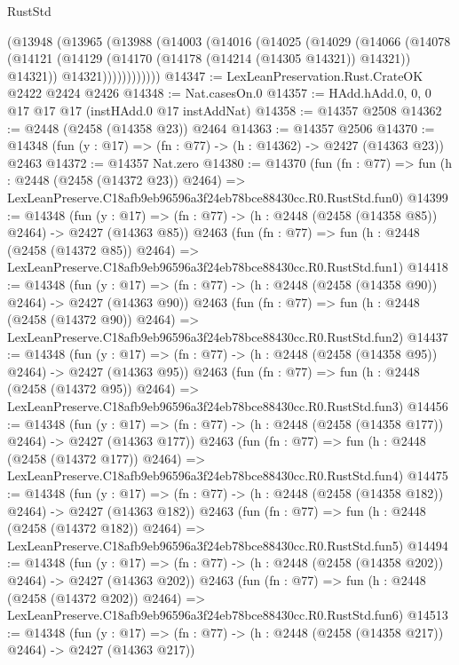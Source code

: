 \begin{lexlean}{RustStd}
\begin{coremodule}
          (@13948
            (@13965
              (@13988
                (@14003
                  (@14016
                    (@14025
                      (@14029
                        (@14066
                          (@14078
                            (@14121
                              (@14129 (@14170 (@14178 (@14214 (@14305 @14321)) @14321)) @14321))
                            @14321))))))))))))
@14347 := LexLeanPreservation.Rust.CrateOK @2422 @2424 @2426
@14348 := Nat.casesOn.{0}
@14357 := HAdd.hAdd.{0, 0, 0} @17 @17 @17 (instHAdd.{0} @17 instAddNat)
@14358 := @14357 @2508
@14362 := @2448 (@2458 (@14358 @23)) @2464
@14363 := @14357 @2506
@14370 := @14348 (fun (y : @17) => (fn : @77) -> (h : @14362) -> @2427 (@14363 @23)) @2463
@14372 := @14357 Nat.zero
@14380 := @14370
    (fun (fn : @77) =>
    fun (h : @2448 (@2458 (@14372 @23)) @2464) =>
    LexLeanPreserve.C18afb9eb96596a3f24eb78bce88430cc.R0.RustStd.fun0)
@14399 := @14348
    (fun (y : @17) => (fn : @77) -> (h : @2448 (@2458 (@14358 @85)) @2464) -> @2427 (@14363 @85))
    @2463
    (fun (fn : @77) =>
    fun (h : @2448 (@2458 (@14372 @85)) @2464) =>
    LexLeanPreserve.C18afb9eb96596a3f24eb78bce88430cc.R0.RustStd.fun1)
@14418 := @14348
    (fun (y : @17) => (fn : @77) -> (h : @2448 (@2458 (@14358 @90)) @2464) -> @2427 (@14363 @90))
    @2463
    (fun (fn : @77) =>
    fun (h : @2448 (@2458 (@14372 @90)) @2464) =>
    LexLeanPreserve.C18afb9eb96596a3f24eb78bce88430cc.R0.RustStd.fun2)
@14437 := @14348
    (fun (y : @17) => (fn : @77) -> (h : @2448 (@2458 (@14358 @95)) @2464) -> @2427 (@14363 @95))
    @2463
    (fun (fn : @77) =>
    fun (h : @2448 (@2458 (@14372 @95)) @2464) =>
    LexLeanPreserve.C18afb9eb96596a3f24eb78bce88430cc.R0.RustStd.fun3)
@14456 := @14348
    (fun (y : @17) => (fn : @77) -> (h : @2448 (@2458 (@14358 @177)) @2464) -> @2427 (@14363 @177))
    @2463
    (fun (fn : @77) =>
    fun (h : @2448 (@2458 (@14372 @177)) @2464) =>
    LexLeanPreserve.C18afb9eb96596a3f24eb78bce88430cc.R0.RustStd.fun4)
@14475 := @14348
    (fun (y : @17) => (fn : @77) -> (h : @2448 (@2458 (@14358 @182)) @2464) -> @2427 (@14363 @182))
    @2463
    (fun (fn : @77) =>
    fun (h : @2448 (@2458 (@14372 @182)) @2464) =>
    LexLeanPreserve.C18afb9eb96596a3f24eb78bce88430cc.R0.RustStd.fun5)
@14494 := @14348
    (fun (y : @17) => (fn : @77) -> (h : @2448 (@2458 (@14358 @202)) @2464) -> @2427 (@14363 @202))
    @2463
    (fun (fn : @77) =>
    fun (h : @2448 (@2458 (@14372 @202)) @2464) =>
    LexLeanPreserve.C18afb9eb96596a3f24eb78bce88430cc.R0.RustStd.fun6)
@14513 := @14348
    (fun (y : @17) => (fn : @77) -> (h : @2448 (@2458 (@14358 @217)) @2464) -> @2427 (@14363 @217))

\end{coremodule}
\end{lexlean}
